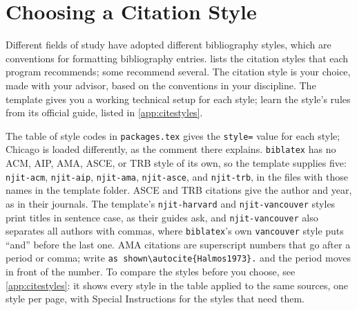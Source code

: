 \section{Choosing a Citation Style}
\label{sec:citestyles}

Different fields of study have adopted different bibliography styles, which are conventions for formatting bibliography entries.  lists the citation styles that each program recommends; some recommend several. The citation style is your choice, made with your advisor, based on the conventions in your discipline. The template gives you a working technical setup for each style; learn the style's rules from its official guide, listed in \cref{app:citestyles}.

The table of style codes in \texttt{packages.tex} gives the \texttt{style=} value for each style; Chicago is loaded differently, as the comment there explains. \texttt{biblatex} has no ACM, AIP, AMA, ASCE, or TRB style of its own, so the template supplies five: \texttt{njit-acm}, \texttt{njit-aip}, \texttt{njit-ama}, \texttt{njit-asce}, and \texttt{njit-trb}, in the files with those names in the template folder. ASCE and TRB citations give the author and year, as in their journals. The template's \texttt{njit-harvard} and \texttt{njit-vancouver} styles print titles in sentence case, as their guides ask, and \texttt{njit-vancouver} also separates all authors with commas, where \texttt{biblatex}'s own \texttt{vancouver} style puts ``and'' before the last one. AMA citations are superscript numbers that go after a period or comma; write \verb+as shown\autocite{Halmos1973}.+ and the period moves in front of the number. To compare the styles before you choose, see \cref{app:citestyles}: it shows every style in the table applied to the same sources, one style per page, with Special Instructions for the styles that need them.


